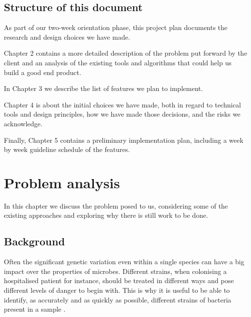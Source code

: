 \documentclass{report}
\begin{document}
\section {Structure of this document}
As part of our two-week orientation phase, this project plan documents the research and design choices we have made. 

Chapter 2 contains a more detailed description of the problem put forward by the client and an analysis of the existing tools and algorithms that could help us build a good end product.

In Chapter 3 we describe the list of features we plan to implement. 

Chapter 4 is about the initial choices we have made, both in regard to technical tools and design principles, how we have made those decisions, and the risks we acknowledge.

Finally, Chapter 5 contains a preliminary implementation plan, including a week by week guideline schedule of the features.







































\chapter{Problem analysis}
In this chapter we discuss the problem posed to us, considering some of the existing approaches and exploring why there is still work to be done.


\section{Background}
Often the significant genetic variation even within a single species can have a big impact over the properties of microbes. Different strains, when colonising a hospitalised patient for instance, should be treated in different ways and pose different levels of danger to begin with. This is why it is useful to be able to identify, as accurately and as quickly as possible, different strains of bacteria present in a sample \cite{mbs:/content/journal/mgen/10.1099/mgen.0.000075}. 
\end{document}
